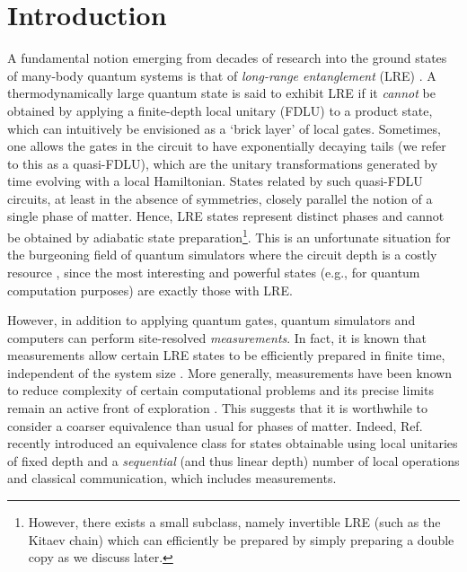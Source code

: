 \documentclass[nofootinbib,prx,twocolumn,showpacs,superscriptaddress,notitlepage,amsmath,amssymb]{revtex4-2}
\theoremstyle{definition}
\begin{document}
\maketitle

\tableofcontents

\section{Introduction}
A fundamental notion emerging from decades of research into the ground states of many-body quantum systems is that of \emph{long-range entanglement} (LRE) \cite{BravyiHastingsVerstraete06,Hastings2010,ChenGuWen11A,ChenGuWen11B,ZengWen15,HuangChen2015,Haah2016}. A thermodynamically large quantum state is said to exhibit LRE if it \emph{cannot} be obtained by applying a finite-depth local unitary (FDLU) to a product state, which can intuitively be envisioned as a `brick layer' of local gates. Sometimes, one allows the gates in the circuit to have exponentially decaying tails (we refer to this as a quasi-FDLU), which are the unitary transformations generated by time evolving with a local Hamiltonian.
States related by such quasi-FDLU circuits, at least in the absence of symmetries, closely parallel the notion of a single phase of matter. Hence, LRE states represent distinct phases and cannot be obtained by adiabatic state preparation\footnote{However, there exists a small subclass, namely invertible LRE (such as the Kitaev chain) which can efficiently be prepared by simply preparing a double copy as we discuss later.}.
This is an unfortunate situation for the burgeoning field of quantum simulators where the circuit depth is a costly resource \cite{NISQ}, since the most interesting and powerful states (e.g., for quantum computation purposes) are exactly those with LRE.

However, in addition to applying quantum gates, quantum simulators and computers can perform site-resolved \emph{measurements}. In fact, it is known that measurements allow certain LRE states to be efficiently prepared in finite time, independent of the system size \cite{Briegel01,Raussendorf05,Aguado08,Bolt16,Piroli21,HastingsHaah21,measureSPT,Rydberg,Bravyi22,Lu2022,oneshot}. More generally, measurements have been known to reduce complexity of certain computational problems and its precise limits remain an active front of exploration \cite{Hoyer05,GottesmanChuang99,Jozsa06,Browne10,LiuGheorghiu21,Friedman22}. This suggests that it is worthwhile to consider a coarser equivalence than usual for phases of matter. Indeed, Ref.~ recently introduced an equivalence class for states obtainable using local unitaries of fixed depth and a \emph{sequential} (and thus linear depth) number of local operations and classical communication, which includes measurements. 
\end{document}
